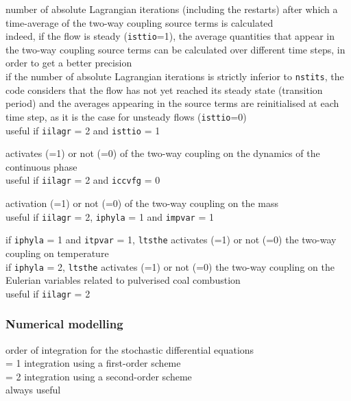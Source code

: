 {number of absolute Lagrangian iterations (including the restarts)
after which a time-average of the two-way coupling source terms is
calculated\\
indeed, if the flow is steady (\texttt{isttio}=1), the average quantities
that appear in the two-way coupling source terms can be calculated over
different time steps, in order to get a better precision\\
if the number of absolute Lagrangian iterations is strictly inferior to
\texttt{nstits}, the code considers that the flow has not yet reached its
steady state (transition period) and the averages appearing in the source
terms are reinitialised at each time step, as it is the case for unsteady
flows (\texttt{isttio}=0)\\
useful if \texttt{iilagr} = 2 and \texttt{isttio} = 1}

{activates (=1) or not (=0) of the two-way coupling on the dynamics of the
continuous phase\\
useful if \texttt{iilagr} = 2 and \texttt{iccvfg} = 0}

{activation (=1) or not (=0) of the two-way coupling on the mass\\
useful if \texttt{iilagr} = 2, \texttt{iphyla} = 1 and \texttt{impvar} = 1}

{if \texttt{iphyla} = 1 and \texttt{itpvar} = 1, \texttt{ltsthe}
 activates (=1) or not (=0) the two-way coupling on temperature\\
if \texttt{iphyla} = 2, \texttt{ltsthe} activates (=1) or not (=0) the
two-way coupling on the Eulerian variables related to pulverised coal
combustion\\
useful if \texttt{iilagr} = 2}

\subsubsection{Numerical modelling}

{order of integration for the stochastic differential equations\\
\hspace*{1.3cm} = 1 integration using a first-order scheme\\
\hspace*{1.3cm} = 2 integration using a second-order scheme\\
always useful}

